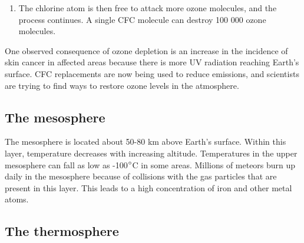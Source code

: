 {\begin{enumerate}
{\begin{equation*}
\text{ClO} + \text{O} \rightarrow \text{Cl} + \text{O}_{2}
\end{equation*}
}
\item{The chlorine atom is then free to attack more ozone molecules, and the process continues. A single CFC molecule can destroy 100 000 ozone molecules.}
\end{enumerate}
One observed consequence of ozone depletion is an increase in the incidence of skin cancer in affected areas because there is more UV radiation reaching Earth's surface. CFC replacements are now being used to reduce emissions, and scientists are trying to find ways to restore ozone levels in the atmosphere.}

\subsection{The mesosphere}

The mesosphere is located about 50-80 km above Earth's surface. Within this layer, temperature decreases with increasing altitude. Temperatures in the upper mesosphere can fall as low as -100$^{\circ}$C in some areas. Millions of meteors burn up daily in the mesosphere because of collisions with the gas particles that are present in this layer. This leads to a high concentration of iron and other metal atoms.

\subsection{The thermosphere}

